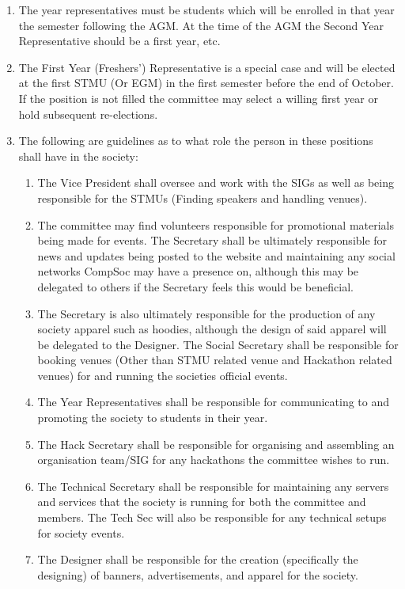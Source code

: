\begin {enumerate}
  \item The year representatives must be students which will be enrolled in that year the semester
    following the AGM. At the time of the AGM the Second Year Representative should be a first year, etc.

  \item The First Year (Freshers') Representative is a special case and will be elected at the first STMU (Or EGM)
    in the first semester before the end of October. If the position is not filled the committee may select a
    willing first year or hold subsequent re-elections.

  \item The following are guidelines as to what role the person in these positions shall have in the society:
    \begin{enumerate}
      \item The Vice President shall oversee and work with the SIGs as well as
        being responsible for the STMUs (Finding speakers and handling venues).
      \item The committee may find volunteers responsible for promotional materials
        being made for events. The Secretary shall be ultimately
        responsible for news and updates being posted to the website and
        maintaining any social networks CompSoc may have a presence on,
        although this may be delegated to others if the Secretary feels this
        would be beneficial.
      \item The Secretary is also ultimately responsible for the production of any
        society apparel such as hoodies, although the design of said apparel will be 
        delegated to the Designer. The Social Secretary shall be responsible for booking 
        venues (Other than STMU related venue and Hackathon related venues) for and 
        running the societies official events.
      \item The Year Representatives shall be responsible for communicating to
        and promoting the society to students in their year.
      \item The Hack Secretary shall be responsible for organising and assembling
        an organisation team/SIG for any hackathons the committee wishes to run.
      \item The Technical Secretary shall be responsible for maintaining any servers
        and services that the society is running for both the committee and members.
        The Tech Sec will also be responsible for any technical setups for society events.
      \item The Designer shall be responsible for the creation (specifically the designing) 
        of banners, advertisements, and apparel for the society. 
    \end{enumerate}


\end{enumerate}
